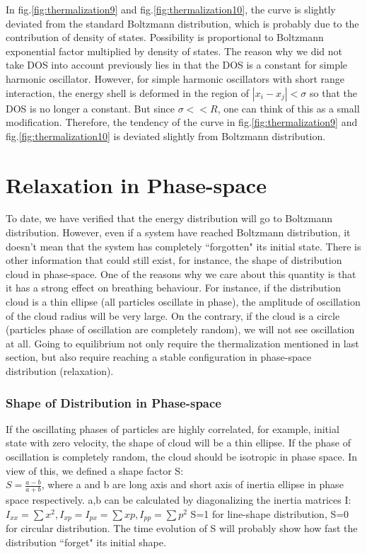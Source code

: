 \documentclass[aps,pre,twocolumn
,groupedaddress]{revtex4-1}
\begin{document}
In fig.\ref{fig:thermalization9} and fig.\ref{fig:thermalization10}, the curve is slightly deviated from the standard Boltzmann distribution, which is probably due to the contribution of density of states. Possibility is proportional to Boltzmann exponential factor multiplied by density of states. The reason why we did not take DOS into account previously lies in that the DOS is a constant for simple harmonic oscillator. However, for simple harmonic oscillators with short range interaction, the energy shell is deformed in the region of $|x_i-x_j|<\sigma$ so that the DOS is no longer a constant. But since $\sigma<<R$, one can think of this as a small modification. Therefore, the tendency of the curve in fig.\ref{fig:thermalization9} and fig.\ref{fig:thermalization10} is deviated slightly from Boltzmann distribution.
 




\newpage
\section{Relaxation in Phase-space}
To date, we have verified that the energy distribution will go to Boltzmann distribution. However, even if a system have reached Boltzmann distribution, it doesn't mean that the system has completely ``forgotten" its initial state. There is other information that could still exist, for instance, the shape of distribution cloud in phase-space. One of the reasons why we care about this quantity is that it has a strong effect on breathing behaviour. For instance, if the distribution cloud is a thin ellipse (all particles oscillate in phase), the amplitude of oscillation of the cloud radius will be very large. On the contrary, if the cloud is a circle (particles phase of oscillation are completely random), we will not see oscillation at all. Going to equilibrium not only require the thermalization mentioned in last section, but also require reaching a stable configuration in phase-space distribution (relaxation).


\subsubsection{Shape of Distribution in Phase-space}
If the oscillating phases of particles are highly correlated, for example, initial state with zero velocity, the shape of cloud will be a thin ellipse. If the phase of oscillation is completely random, the cloud should be isotropic in phase space. In view of this, we defined a shape factor S:
\\$S=\frac{a-b}{a+b}$, where a and b are long axis and short axis of inertia ellipse in phase space respectively. a,b can be calculated by diagonalizing the inertia matrices I: $I_{xx}=\sum{x^2}, I_{xp}=I_{px}=\sum{xp},I_{pp}=\sum{p^2}$
S=1 for line-shape distribution, S=0 for circular distribution.
The time evolution of S will probably show how fast the distribution ``forget" its initial shape.  
\end{document}
